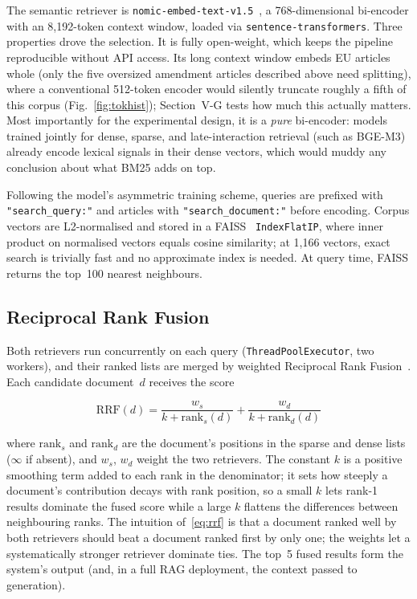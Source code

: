 \documentclass[conference,a4paper]{IEEEtran}
\newcommand{\nomic}{\texttt{nomic-embed-text-v1.5}\xspace}
\begin{document}
The semantic retriever is \nomic~\cite{16}, a 768-dimensional
bi-encoder with an 8{,}192-token context window, loaded via
\texttt{sentence-transformers}.
Three properties drove the selection.
It is fully open-weight, which keeps the pipeline reproducible
without API access.
Its long context window embeds EU articles whole (only the five
oversized amendment articles described above need splitting), where a
conventional 512-token encoder would silently truncate roughly a
fifth of this corpus (Fig.~\ref{fig:tokhist}); Section~V-G tests how
much this actually matters.
Most importantly for the experimental design, it is a \emph{pure}
bi-encoder: models trained jointly for dense, sparse, and
late-interaction retrieval (such as BGE-M3) already encode lexical
signals in their dense vectors, which would muddy any conclusion
about what BM25 adds on top.

Following the model's asymmetric training scheme, queries are
prefixed with \texttt{"search\_query:"} and articles with
\texttt{"search\_document:"} before encoding.
Corpus vectors are L2-normalised and stored in a FAISS~\cite{17}
\texttt{IndexFlatIP}, where inner product on normalised vectors
equals cosine similarity; at 1{,}166 vectors, exact search is
trivially fast and no approximate index is needed.
At query time, FAISS returns the top~100 nearest neighbours.

\subsection{Reciprocal Rank Fusion}

Both retrievers run concurrently on each query
(\texttt{ThreadPool\-Executor}, two workers), and their ranked lists
are merged by weighted Reciprocal Rank Fusion~\cite{14}.
Each candidate document~$d$ receives the score

\begin{equation}
  \mathrm{RRF}(d) = \frac{w_s}{k + \mathrm{rank}_s(d)}
                  + \frac{w_d}{k + \mathrm{rank}_d(d)}
  \label{eq:rrf}
\end{equation}

\noindent where $\mathrm{rank}_s$ and $\mathrm{rank}_d$ are the
document's positions in the sparse and dense lists
($\infty$ if absent), and $w_s$, $w_d$ weight the two retrievers.
The constant $k$ is a positive smoothing term added to each rank in
the denominator; it sets how steeply a document's contribution decays
with rank position, so a small $k$ lets rank-1 results dominate the
fused score while a large $k$ flattens the differences between
neighbouring ranks.
The intuition of~\eqref{eq:rrf} is that a document ranked well by
both retrievers should beat a document ranked first by only one; the
weights let a systematically stronger retriever dominate ties.
The top~5 fused results form the system's output (and, in a full RAG
deployment, the context passed to generation).
\end{document}
